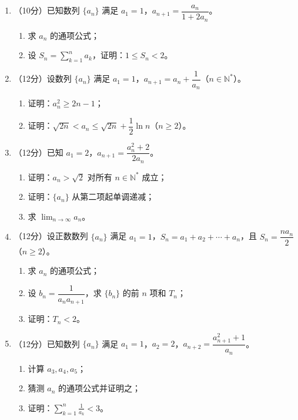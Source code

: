 \documentclass[12pt, a4paper]{ctexart}
\begin{document}
\begin{enumerate}[resume]
\item （10分）已知数列 $\{a_n\}$ 满足 $a_1 = 1$，$a_{n+1} = \dfrac{a_n}{1 + 2a_n}$。
\begin{enumerate}[label=(\arabic*)]
\item 求 $a_n$ 的通项公式；
\item 设 $S_n = \displaystyle\sum_{k=1}^{n} a_k$，证明：$1 \leqslant S_n < 2$。
\end{enumerate}

\item （12分）设数列 $\{a_n\}$ 满足 $a_1 = 1$，$a_{n+1} = a_n + \dfrac{1}{a_n}$（$n \in \mathbb{N}^*$）。
\begin{enumerate}[label=(\arabic*)]
\item 证明：$a_n^2 \geqslant 2n - 1$；
\item 证明：$\sqrt{2n} < a_n \leqslant \sqrt{2n} + \dfrac{1}{2}\ln n$（$n \geqslant 2$）。
\end{enumerate}

\item （12分）已知 $a_1 = 2$，$a_{n+1} = \dfrac{a_n^2 + 2}{2a_n}$。
\begin{enumerate}[label=(\arabic*)]
\item 证明：$a_n > \sqrt{2}$ 对所有 $n \in \mathbb{N}^*$ 成立；
\item 证明：$\{a_n\}$ 从第二项起单调递减；
\item 求 $\displaystyle\lim_{n \to \infty} a_n$。
\end{enumerate}

\item （12分）设正数数列 $\{a_n\}$ 满足 $a_1 = 1$，$S_n = a_1 + a_2 + \cdots + a_n$，且 $S_n = \dfrac{n a_n}{2}$（$n \geqslant 2$）。
\begin{enumerate}[label=(\arabic*)]
\item 求 $a_n$ 的通项公式；
\item 设 $b_n = \dfrac{1}{a_n a_{n+1}}$，求 $\{b_n\}$ 的前 $n$ 项和 $T_n$；
\item 证明：$T_n < 2$。
\end{enumerate}

\item （12分）已知数列 $\{a_n\}$ 满足 $a_1 = 1$，$a_2 = 2$，$a_{n+2} = \dfrac{a_{n+1}^2 + 1}{a_n}$。
\begin{enumerate}[label=(\arabic*)]
\item 计算 $a_3, a_4, a_5$；
\item 猜测 $a_n$ 的通项公式并证明之；
\item 证明：$\displaystyle\sum_{k=1}^{n} \frac{1}{a_k} < 3$。
\end{enumerate}


\end{enumerate}
\end{document}
